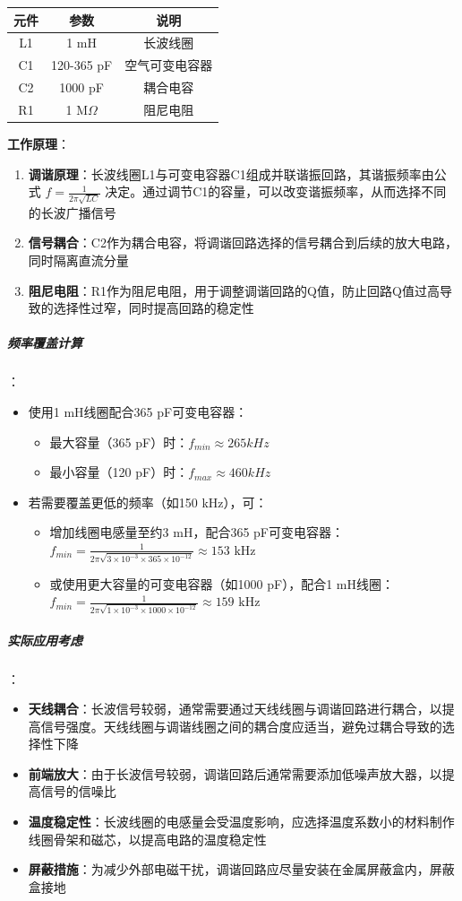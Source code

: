 \begin{center}
\begin{tabular}{|c|c|c|}
\hline
\textbf{元件} & \textbf{参数} & \textbf{说明} \\
\hline
L1 & 1 mH & 长波线圈 \\
C1 & 120-365 pF & 空气可变电容器 \\
C2 & 1000 pF & 耦合电容 \\
R1 & 1 M$\Omega$ & 阻尼电阻 \\
\hline
\end{tabular}
\end{center}

\textbf{工作原理}：
\begin{enumerate}
    \item \textbf{调谐原理}：长波线圈L1与可变电容器C1组成并联谐振回路，其谐振频率由公式 $f = \frac{1}{2\pi\sqrt{LC}}$ 决定。通过调节C1的容量，可以改变谐振频率，从而选择不同的长波广播信号
    \item \textbf{信号耦合}：C2作为耦合电容，将调谐回路选择的信号耦合到后续的放大电路，同时隔离直流分量
    \item \textbf{阻尼电阻}：R1作为阻尼电阻，用于调整调谐回路的Q值，防止回路Q值过高导致的选择性过窄，同时提高回路的稳定性
\end{enumerate}

\subparagraph{频率覆盖计算}：
\begin{itemize}
  \item 使用1 mH线圈配合365 pF可变电容器：
    \begin{itemize}
      \item 最大容量（365 pF）时：$ f_{min} \approx 265 kHz $
      \item 最小容量（120 pF）时：$ f_{max} \approx 460 kHz $
    \end{itemize}
  \item 若需要覆盖更低的频率（如150 kHz），可：
    \begin{itemize}
      \item 增加线圈电感量至约3 mH，配合365 pF可变电容器：$ f_{min} = \frac{1}{2\pi\sqrt{3\times10^{-3} \times 365\times10^{-12}}} \approx 153 \text{ kHz} $
      \item 或使用更大容量的可变电容器（如1000 pF），配合1 mH线圈：$ f_{min} = \frac{1}{2\pi\sqrt{1\times10^{-3} \times 1000\times10^{-12}}} \approx 159 \text{ kHz} $
    \end{itemize}
\end{itemize}

\subparagraph{实际应用考虑}：
\begin{itemize}
    \item \textbf{天线耦合}：长波信号较弱，通常需要通过天线线圈与调谐回路进行耦合，以提高信号强度。天线线圈与调谐线圈之间的耦合度应适当，避免过耦合导致的选择性下降
    \item \textbf{前端放大}：由于长波信号较弱，调谐回路后通常需要添加低噪声放大器，以提高信号的信噪比
    \item \textbf{温度稳定性}：长波线圈的电感量会受温度影响，应选择温度系数小的材料制作线圈骨架和磁芯，以提高电路的温度稳定性
    \item \textbf{屏蔽措施}：为减少外部电磁干扰，调谐回路应尽量安装在金属屏蔽盒内，屏蔽盒接地
\end{itemize}

